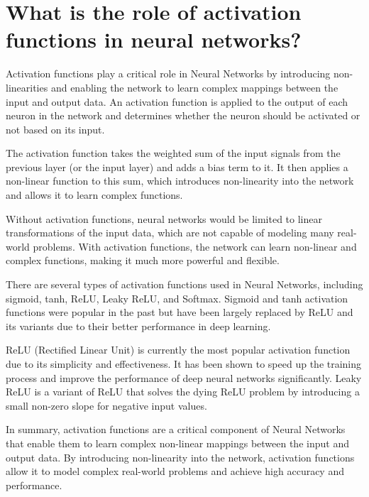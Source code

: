 \section{What is the role of activation functions in neural networks?}
Activation functions play a critical role in Neural Networks by introducing non-linearities and enabling the network to learn complex mappings between the input and output data. An activation function is applied to the output of each neuron in the network and determines whether the neuron should be activated or not based on its input.

The activation function takes the weighted sum of the input signals from the previous layer (or the input layer) and adds a bias term to it. It then applies a non-linear function to this sum, which introduces non-linearity into the network and allows it to learn complex functions.

Without activation functions, neural networks would be limited to linear transformations of the input data, which are not capable of modeling many real-world problems. With activation functions, the network can learn non-linear and complex functions, making it much more powerful and flexible.

There are several types of activation functions used in Neural Networks, including sigmoid, tanh, ReLU, Leaky ReLU, and Softmax. Sigmoid and tanh activation functions were popular in the past but have been largely replaced by ReLU and its variants due to their better performance in deep learning.

ReLU (Rectified Linear Unit) is currently the most popular activation function due to its simplicity and effectiveness. It has been shown to speed up the training process and improve the performance of deep neural networks significantly. Leaky ReLU is a variant of ReLU that solves the dying ReLU problem by introducing a small non-zero slope for negative input values.

In summary, activation functions are a critical component of Neural Networks that enable them to learn complex non-linear mappings between the input and output data. By introducing non-linearity into the network, activation functions allow it to model complex real-world problems and achieve high accuracy and performance.

